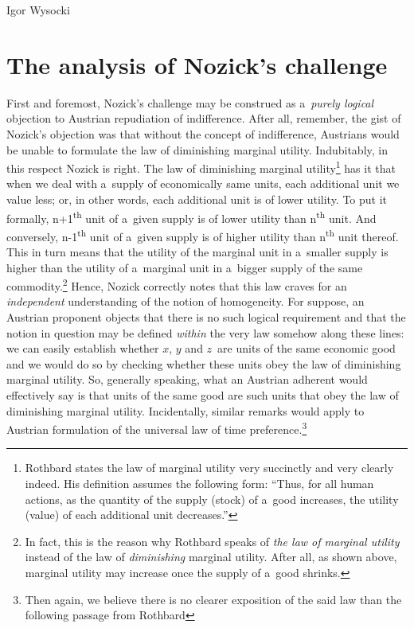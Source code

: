 \begin{artengenv}{Igor Wysocki}
\section{The analysis of Nozick's challenge}
First and foremost, Nozick's challenge may be construed as a~\textit{purely logical} objection to Austrian repudiation of indifference. After all, remember, the gist of Nozick's objection was that without the concept of indifference, Austrians would be unable to formulate the law of diminishing marginal utility. Indubitably, in this respect Nozick is right. The law of diminishing marginal utility\footnote{Rothbard
\parencite*[][p.25]{rothbard_man_2009} %
 states the law of marginal utility very succinctly and very clearly indeed. His definition assumes the following form: ``Thus, for all human actions, as the quantity of the supply (stock) of a~good increases, the utility (value) of each additional unit decreases.''} has it that when we deal with a~supply of economically same units, each additional unit we value less; or, in other words, each additional unit is of lower utility. To put it formally, n+1\textsuperscript{th} unit of a~given supply is of lower utility than n\textsuperscript{th} unit. And conversely, n-1\textsuperscript{th} unit of a~given supply is of higher utility than n\textsuperscript{th} unit thereof. This in turn means that the utility of the marginal unit in a~smaller supply is higher than the utility of a~marginal unit in a~bigger supply of the same commodity.\footnote{In fact, this is the reason why Rothbard 
\parencite*[][pp.21–23]{rothbard_man_2009} %
 speaks of \textit{the law of marginal utility} instead of the law of \textit{diminishing} marginal utility. After all, as shown above, marginal utility may increase once the supply of a~good shrinks.} Hence, Nozick correctly notes that this law craves for an \textit{independent} understanding of the notion of homogeneity. For suppose, an Austrian proponent objects that there is no such logical requirement and that the notion in question may be defined \textit{within} the very law somehow along these lines: we can easily establish whether $x$, $y$ and $z$~are units of the same economic good and we would do so by checking whether these units obey the law of diminishing marginal utility. So, generally speaking, what an Austrian adherent would effectively say is that units of the same good are such units that obey the law of diminishing marginal utility. Incidentally, similar remarks would apply to Austrian formulation of the universal law of time preference.\footnote{Then again, we believe there is no clearer exposition of the said law than the following passage from Rothbard 
}
\end{artengenv}
